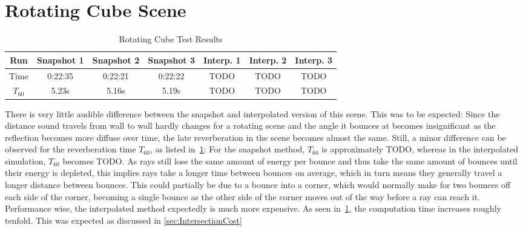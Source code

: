 \section{Rotating Cube Scene}

\begin{table}[t!]\label{tbl:CubeScene}
\centering
    \begin{tabular}{| c | c | c | c | c | c | c |}
        \hline
        Run & Snapshot 1 & Snapshot 2 & Snapshot 3 & Interp. 1 & Interp. 2 & Interp. 3 \\
        \hline
        Time & 0:22:35 & 0:22:21 & 0:22:22 & TODO & TODO & TODO \\
        \hline
        \(T_{60}\) & 5.23s & 5.16s & 5.19s & TODO & TODO & TODO \\
        \hline
    \end{tabular}
    \caption{Rotating Cube Test Results}
\end{table}
There is very little audible difference between the snapshot and interpolated version of this scene.
This was to be expected: Since the distance sound travels from wall to wall hardly changes for a rotating scene
and the angle it bounces at becomes insignificant as the reflection becomes more diffuse over time,
the late reverberation in the scene becomes almost the same.
\newline
Still, a minor difference can be observed for the reverberation time \(T_{60}\),
as listed in~\ref{tbl:CubeScene}:
For the snapshot method, \(T_{60}\) is approximately TODO,
whereas in the interpolated simulation, \(T_{60}\) becomes TODO.
\newline
As rays still lose the same amount of energy per bounce
and thus take the same amount of bounces until their energy is depleted,
this implies rays take a longer time between bounces on average,
which in turn means they generally travel a longer distance between bounces.
\newline
This could partially be due to a bounce into a corner,
which would normally make for two bounces off each side of the corner,
becoming a single bounce as the other side of the corner moves out of the way before a ray can reach it.
\newline
Performance wise, the interpolated method expectedly is much more expensive.
As seen in~\ref{tbl:CubeScene}, the computation time increases roughly tenfold.
This was expected as discussed in \autoref{sec:IntersectionCost}

